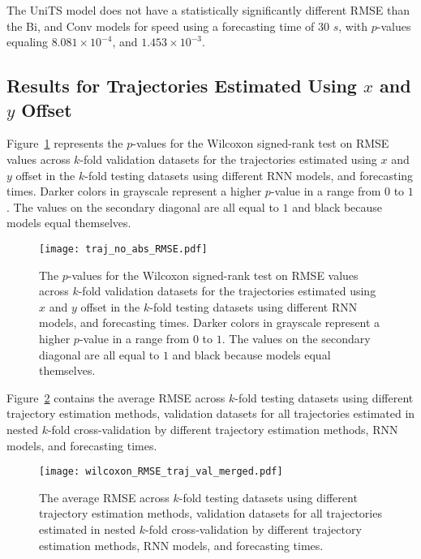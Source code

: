 The UniTS model does not have a statistically significantly different RMSE than the Bi, and Conv models for speed using a forecasting time of $30$ $s$, with $p$-values equaling $8.081 \times 10^{-4}$, and $1.453 \times 10^{-3}$.

\subsection{Results for Trajectories Estimated Using $x$ and $y$ Offset}

Figure~\ref{fig:traj_no_abs_RMSE} represents the $p$-values for the Wilcoxon signed-rank test on RMSE values across $k$-fold validation datasets for the trajectories estimated using $x$ and $y$ offset in the $k$-fold testing datasets using different RNN models, and forecasting times. Darker colors in grayscale represent a higher $p$-value in a range from $0$ to $1$. The values on the secondary diagonal are all equal to $1$ and black because models equal themselves.

\begin{figure}[!ht]
	\centering
	\texttt{[image: traj\_no\_abs\_RMSE.pdf]}
	\caption{The $p$-values for the Wilcoxon signed-rank test on RMSE values across $k$-fold validation datasets for the trajectories estimated using $x$ and $y$ offset in the $k$-fold testing datasets using different RNN models, and forecasting times. Darker colors in grayscale represent a higher $p$-value in a range from $0$ to $1$. The values on the secondary diagonal are all equal to $1$ and black because models equal themselves.}
	\label{fig:traj_no_abs_RMSE}
\end{figure}

Figure~\ref{fig:wilcoxon_RMSE_traj_val_merged} contains the average RMSE across $k$-fold testing datasets using different trajectory estimation methods, validation datasets for all trajectories estimated in nested $k$-fold cross-validation by different trajectory estimation methods, RNN models, and forecasting times.

\begin{figure}[!ht]
	\centering
	\texttt{[image: wilcoxon\_RMSE\_traj\_val\_merged.pdf]}
	\caption{The average RMSE across $k$-fold testing datasets using different trajectory estimation methods, validation datasets for all trajectories estimated in nested $k$-fold cross-validation by different trajectory estimation methods, RNN models, and forecasting times.}
	\label{fig:wilcoxon_RMSE_traj_val_merged}
\end{figure}

